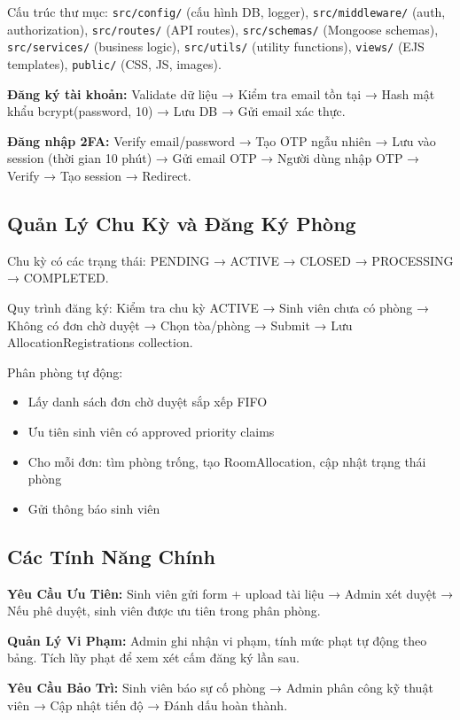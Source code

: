 \documentclass[12pt,a4paper]{article}
\begin{document}
Cấu trúc thư mục: \texttt{src/config/} (cấu hình DB, logger), \texttt{src/middleware/} (auth, authorization), \texttt{src/routes/} (API routes), \texttt{src/schemas/} (Mongoose schemas), \texttt{src/services/} (business logic), \texttt{src/utils/} (utility functions), \texttt{views/} (EJS templates), \texttt{public/} (CSS, JS, images).

\textbf{Đăng ký tài khoản:} Validate dữ liệu → Kiểm tra email tồn tại → Hash mật khẩu bcrypt(password, 10) → Lưu DB → Gửi email xác thực.

\textbf{Đăng nhập 2FA:} Verify email/password → Tạo OTP ngẫu nhiên → Lưu vào session (thời gian 10 phút) → Gửi email OTP → Người dùng nhập OTP → Verify → Tạo session → Redirect.

\subsection{Quản Lý Chu Kỳ và Đăng Ký Phòng}

Chu kỳ có các trạng thái: PENDING → ACTIVE → CLOSED → PROCESSING → COMPLETED.

Quy trình đăng ký: Kiểm tra chu kỳ ACTIVE → Sinh viên chưa có phòng → Không có đơn chờ duyệt → Chọn tòa/phòng → Submit → Lưu AllocationRegistrations collection.

Phân phòng tự động:
\begin{itemize}
  \item Lấy danh sách đơn chờ duyệt sắp xếp FIFO
  \item Ưu tiên sinh viên có approved priority claims
  \item Cho mỗi đơn: tìm phòng trống, tạo RoomAllocation, cập nhật trạng thái phòng
  \item Gửi thông báo sinh viên
\end{itemize}

\subsection{Các Tính Năng Chính}

\textbf{Yêu Cầu Ưu Tiên:} Sinh viên gửi form + upload tài liệu → Admin xét duyệt → Nếu phê duyệt, sinh viên được ưu tiên trong phân phòng.

\textbf{Quản Lý Vi Phạm:} Admin ghi nhận vi phạm, tính mức phạt tự động theo bảng. Tích lũy phạt để xem xét cấm đăng ký lần sau.

\textbf{Yêu Cầu Bảo Trì:} Sinh viên báo sự cố phòng → Admin phân công kỹ thuật viên → Cập nhật tiến độ → Đánh dấu hoàn thành.
\end{document}
